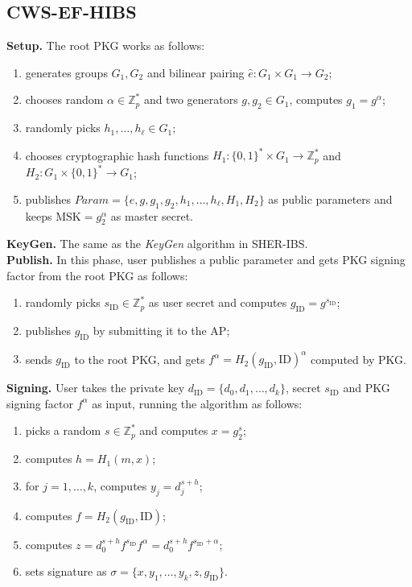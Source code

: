 \documentclass[letter]{ieice}
\begin{document}
\subsection{CWS-EF-HIBS } \label{sec-efhibs}
\textbf{Setup.} The root PKG works as follows:
\begin{enumerate}
\item generates groups $G_1, G_2$ and bilinear pairing $\hat{e}: G_1 \times G_1 \rightarrow G_2$;
\item chooses random $\alpha \in \mathbb{Z}^*_p$ and two generators $g, g_2 \in G_1$, computes $g_1 = g^\alpha$;
\item randomly picks $h_1, \ldots, h_\ell \in G_1$;
\item chooses cryptographic hash functions $H_1: \{0, 1\}^* \times G_1 \rightarrow \mathbb{Z}_p^*$ and $H_2: G_1 \times \{0, 1\}^* \rightarrow G_1$;
\item publishes $Param = \{\hat{e}, g, g_1,  g_2, h_1, \ldots, h_\ell, H_1, H_2\}$ as public parameters and keeps $\mathrm{MSK} = g_2^\alpha$ as master secret.
\end{enumerate}
\textbf{KeyGen.} 
The same as the \emph{KeyGen} algorithm in SHER-IBS.
\\
\textbf{Publish.} In this phase, user publishes a public parameter and gets PKG signing factor from the root PKG as follows:
\begin{enumerate}
\item randomly picks $s_{\mathrm{ID}} \in \mathbb{Z}_p^*$ as user secret and computes $g_{\mathrm{ID}} = g^{s_{\mathrm{ID}}}$;
\item publishes $g_{\mathrm{ID}}$ by submitting it to the AP;
\item sends $g_{\mathrm{ID}}$ to the root PKG, and gets $f^\alpha = H_2(g_\mathrm{ID}, \mathrm{ID})^\alpha$ computed by PKG. 
\end{enumerate}
\textbf{Signing.} User takes the private key $d_{\mathrm{ID}} = \{d_0, d_1, \ldots, d_k\}$, secret $s_{\mathrm{ID}}$ and PKG signing factor $f^\alpha$ as input, running the algorithm as follows:
\begin{enumerate}
\item picks a random $s \in \mathbb{Z}_p^*$ and computes $x = g_2^s$;
\item computes  $h = H_1(m, x)$;
\item for $j = 1, \ldots, k$, computes $y_j = d_j^{s+h}$;
\item computes $f = H_2(g_\mathrm{ID}, \mathrm{ID})$;
\item computes $z= d_0^{s + h} f^{s_\mathrm{ID}} f^\alpha = d_0^{s + h} f^{s_\mathrm{ID} + \alpha}$;
\item sets signature as $\sigma = \{x, y_1, \ldots, y_k, z, g_{\mathrm{ID}}\}$.
\end{enumerate}
\end{document}
